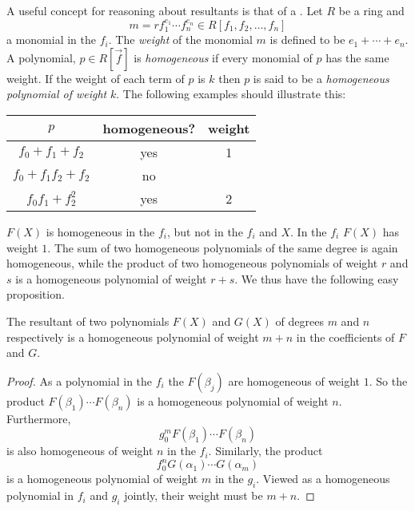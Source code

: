 \medskip
A useful concept for reasoning about resultants is that of a
.
Let $R$ be a ring and
\[
m = r f_{1}^{e_{1}} \cdots f_{n}^{e_{n}} \in R[f_1, f_2, \ldots, f_n]
\]
a monomial in the $f_{i}$.  The {\em weight} of the
monomial $m$ is defined to be $e_{1} +
\cdots + e_{n}$.  A polynomial, $p \in R[\vec f]$ is {\em
homogeneous} if every monomial of $p$ has the same weight.  If the
weight of each term of $p$ is $k$ then $p$ is said to be a {\em
homogeneous polynomial of weight} $k$. The following examples should illustrate this:
\smallskip
\begin{center}
\begin{tabular}{|c|c|c|}
  \multicolumn{1}{c}{$p$} & 
    \multicolumn{1}{c}{homogeneous?} & 
    \multicolumn{1}{c}{weight} \\ \hline
  $f_0 + f_1 + f_2$ & yes & 1 \\ \hline
  $f_0 + f_1 f_2 + f_2$ & no & \\ \hline
  $f_0 f_1 + f_2^2$ & yes & 2 \\ \hline
\end{tabular}
\end{center}
\smallskip
$F(X)$ is homogeneous in the $f_i$, but not in the $f_i$ and $X$.  In
the $f_i$ $F(X)$ has weight $1$.  The sum of two homogeneous
polynomials of the same degree is again homogeneous, while the product
of two homogeneous polynomials of weight $r$ and $s$ is a homogeneous
polynomial of weight $r+s$.  We thus have the following easy
proposition.

\begin{proposition} \label{Resultant:Weight:Prop}
The resultant of two polynomials $F(X)$ and $G(X)$ of degrees $m$ and
$n$ respectively is a homogeneous polynomial of weight $m+n$ in the
coefficients of $F$ and $G$.
\end{proposition}

\begin{proof}
As a polynomial in the $f_{i}$ the $F(\beta_{j})$ are homogeneous of
weight $1$.  So the product $F(\beta_{1}) \cdots F(\beta_{n})$ is a
homogeneous polynomial of weight $n$.  Furthermore,
\[
g_{0}^{m} F(\beta_{1}) \cdots F(\beta_{n})
\]
is also homogeneous of weight $n$ in the $f_{i}$.  Similarly, the
product 
\[
f_{0}^{n} G(\alpha_{1}) \cdots G(\alpha_{m})
\]
 is a homogeneous polynomial of weight $m$ in the $g_{i}$.  Viewed as
a homogeneous polynomial in $f_{i}$ and $g_{i}$ jointly, their weight
must be $m+n$.
\end{proof}

